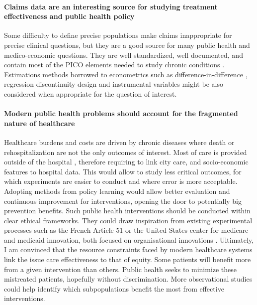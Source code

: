 \documentclass[french,12pt,twoside,a4paper]{book}
\begin{document}
\paragraph{Claims data are an interesting source for studying treatment
  effectiveness and public health policy} Some difficulty to define precise
populations make claims inappropriate for precise clinical questions, but they
are a good source for many public health and medico-economic questions. They
are well standardized, well documented, and contain most of the PICO elements
needed to study chronic conditions \citep{caruana2023administrative}.
Estimations methods borrowed to econometrics such as difference-in-difference
\citep{athey2006identification}, regression discontinuity design
\citep{bor2014regression} and instrumental variables
\citep{greenland2000introduction} might be also considered when appropriate
for the question of interest.

%
\paragraph{Modern public health problems should account for the fragmented
  nature of healthcare} Healthcare burdens and costs are driven by chronic
diseases where death or rehospitalization are not the only outcomes of
interest. Most of care is provided outside of the hospital
\citep{white1961ecology}, therefore requiring to link city care, and
socio-economic features to hospital data. This would allow to study less
critical outcomes, for which experiments are easier to conduct and where error
is more acceptable. Adopting methods from policy learning
\citep{athey2021policy} would allow better evaluation and continuous
improvement for interventions, opening the door to potentially big prevention
benefits. Such public health interventions should be conducted within clear
ethical frameworks. They could draw inspiration from existing experimental
processes such as the French Article 51 or the United States center for
medicare and medicaid innovation, both focused on organisational innovations
\citep{lenormand2021what}.
%
Ultimately, I am convinced that the resource constraints faced by modern
healthcare systems link the issue care effectiveness to that of equity. Some
patients will benefit more from a given intervention than others. Public health
seeks to minimize these mistreated patients, hopefully without discrimination.
More observational studies could help identify which subpopulations benefit the
most from effective interventions.
\end{document}
